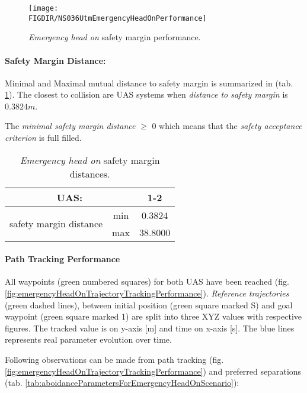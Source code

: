 \begin{figure}[H]
    \centering
    \texttt{[image: \\FIGDIR/NS036UtmEmergencyHeadOnPerformance]} 
    \caption{\emph{Emergency head on} safety margin performance.}
    \label{fig:testCaseHeadOnAvoidancePerformance}
\end{figure}


\paragraph{Safety Margin Distance:} Minimal and Maximal mutual distance to safety margin is summarized in (tab. \ref{tab:testCaseEmergencyHeadOnSafetyMarginDistances}). The closest to collision are UAS systems  when \emph{distance to safety margin} is $0.3824 m$.

The \emph{minimal safety margin distance} $\ge$ $0$ which means that the \emph{safety acceptance criterion} is full filled.


\begin{table}[H]
    \centering
    \begin{tabular}{c|c||c}
    \multicolumn{2}{c||}{UAS:} & 1-2 \\\hline\hline
    \multirow{2}{*}{safety margin distance} & min & 0.3824 \\\cline{2-3}
                                            & max & 38.8000 \\
    \end{tabular}
    \caption{\emph{Emergency head on} safety margin distances.}
    \label{tab:testCaseEmergencyHeadOnSafetyMarginDistances}
\end{table}

\paragraph{Path Tracking Performance} All waypoints (green numbered squares) for both UAS have been reached (fig. \ref{fig:emergencyHeadOnTrajectoryTrackingPerformance}). \emph{Reference trajectories} (green dashed lines), between initial position (green square marked S) and goal waypoint (green square marked 1) are split into three XYZ values with respective figures. The tracked value is on y-axis [m] and time on x-axis [s]. The blue lines represents real parameter evolution over time.

Following observations can be made from path tracking (fig.\ref{fig:emergencyHeadOnTrajectoryTrackingPerformance}) and preferred separations (tab. \ref{tab:aboidanceParametersForEmergencyHeadOnScenario}):

